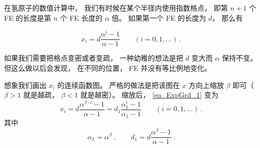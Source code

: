 

在氢原子的数值计算中， 我们有时候在某个半径内使用指数格点， 即第 $n+1$ 个 FE 的长度是第 $n$ 个 FE 长度的 $\alpha$ 倍。 如果第一个 FE 的长度为 $d$， 那么有

\begin{equation}\label{eq_ExpGrd_1}
x_i = d \frac{\alpha^i - 1}{\alpha - 1}
\qquad (i = 0, 1, \dots)~.
\end{equation}

如果我们需要把格点变密或者变疏， 一种幼稚的想法是把 $d$ 变大而 $\alpha$ 保持不变。 但这么做以后会发现， 在不同的位置， FE 并没有等比例地变化。

想象我们画出 $x_i$ 的连续函数图。 严格的做法是把该图在 $x$ 方向上缩放 $\beta$ 即可（$\beta > 1$ 就是越疏， $\beta < 1$ 就是越密）。 缩放后， \autoref{eq_ExpGrd_1} 变为
\begin{equation}
x_i = d \frac{\alpha^{\beta \cdot i} - 1}{\alpha - 1}
= d_1 \frac{\alpha_1^i - 1}{\alpha_1 - 1}
\qquad (i = 0, 1, \dots)~.
\end{equation}
其中
\begin{equation}
\alpha_1 = \alpha^\beta~,
\qquad
d_1 = d \frac{{\alpha^\beta - 1}}{\alpha - 1}~.
\end{equation}
